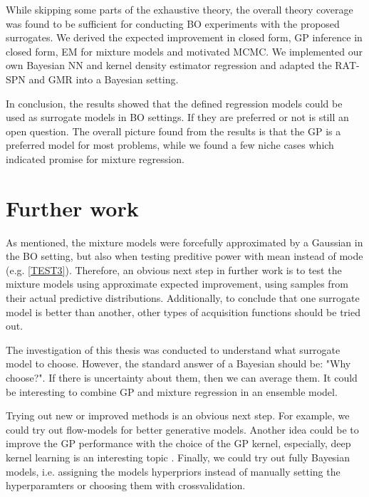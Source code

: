While skipping some parts of the exhaustive theory, the overall theory coverage was found to be
sufficient for conducting BO experiments with the proposed surrogates. We derived the expected
improvement in closed form, GP inference in closed form, EM for mixture models and motivated MCMC.
We implemented our own Bayesian NN and kernel density estimator regression and adapted the RAT-SPN
and GMR into a Bayesian setting.%

In conclusion, the results showed that the defined regression models could be used as surrogate models in BO
settings. If they are preferred or not is still an open question. The overall picture found from the
results is that the GP is a preferred model for most problems, while we found a few niche cases which
indicated promise for mixture regression. 

\section{Further work}
As mentioned, the mixture models were forcefully approximated by a Gaussian in the BO setting, but
also when testing preditive power with mean instead of mode (e.g. \ref{TEST3}). Therefore, an
obvious next step in further work is to test the mixture models using approximate expected
improvement, using samples from their actual predictive distributions. Additionally, to conclude
that one surrogate model is better than another, other types of acquisition functions should be
tried out.

The investigation of this thesis was conducted to understand what surrogate model to choose.
However, the standard answer of a Bayesian should be: "Why choose?". If there is uncertainty about
them, then we can average them. It could be interesting to combine GP and mixture regression in 
an ensemble model.

Trying out new or improved methods is an obvious next step. For example, we could try out
flow-models for better generative models. Another idea could be to improve the GP performance with
the choice of the GP kernel, especially, deep kernel learning is an interesting topic
\cite{DeepKernelLearning}. Finally, we could try out fully Bayesian models, i.e. assigning the
models hyperpriors instead of manually setting the hyperparamters or choosing them with crossvalidation. 

